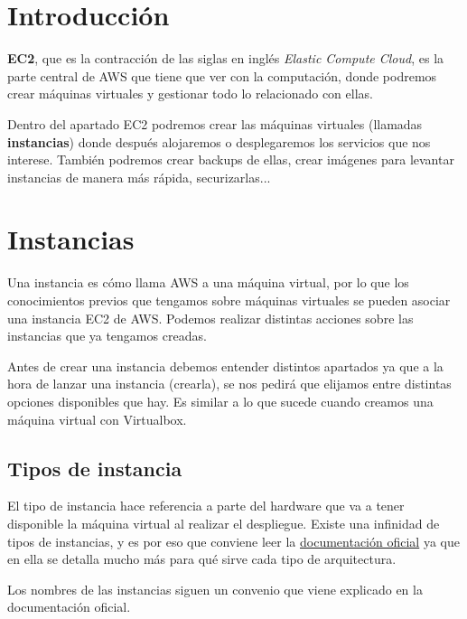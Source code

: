 \chapter{Introducción}

\textbf{EC2}, que es la contracción de las siglas en inglés \textit{Elastic Compute Cloud}, es la parte central de AWS que tiene que ver con la computación, donde podremos crear máquinas virtuales y gestionar todo lo relacionado con ellas.

Dentro del apartado EC2 podremos crear las máquinas virtuales (llamadas \textbf{instancias}) donde después alojaremos o desplegaremos los servicios que nos interese. También podremos crear backups de ellas, crear imágenes para levantar instancias de manera más rápida, securizarlas...

\chapter{Instancias}

Una instancia es cómo llama AWS a una máquina virtual, por lo que los conocimientos previos que tengamos sobre máquinas virtuales se pueden asociar una instancia EC2 de AWS. Podemos realizar distintas acciones sobre las instancias que ya tengamos creadas.

Antes de crear una instancia debemos entender distintos apartados ya que a la hora de lanzar una instancia (crearla), se nos pedirá que elijamos entre distintas opciones disponibles que hay. Es similar a lo que sucede cuando creamos una máquina virtual con Virtualbox.

\section{Tipos de instancia}

El tipo de instancia hace referencia a parte del hardware que va a tener disponible la máquina virtual al realizar el despliegue. Existe una infinidad de tipos de instancias, y es por eso que conviene leer la \href{https://docs.aws.amazon.com/AWSEC2/latest/UserGuide/instance-types.html#AvailableInstanceTypes}{documentación oficial} ya que en ella se detalla mucho más para qué sirve cada tipo de arquitectura.

Los nombres de las instancias siguen un convenio que viene explicado en la documentación oficial.

\begin{center}
	
\end{center}

